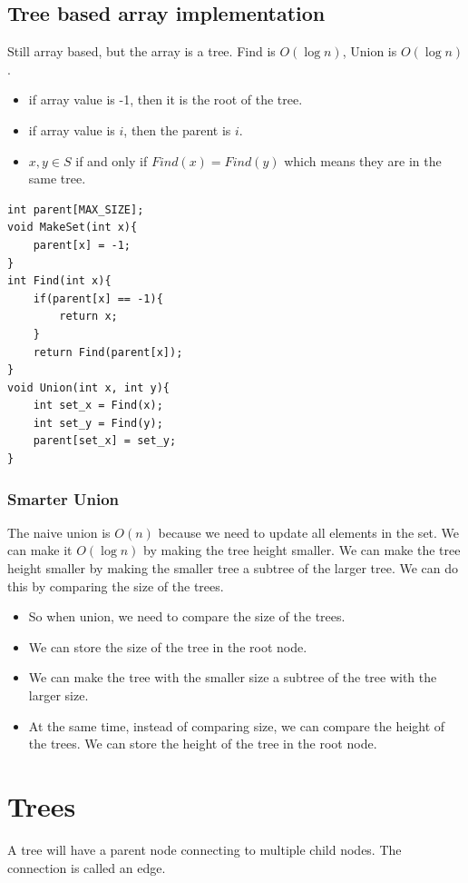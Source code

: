\documentclass[letterpaper,12pt]{article}
\begin{document}
\subsection{Tree based array implementation}
Still array based, but the array is a tree. Find is $O(\log n)$, Union is $O(\log n)$.\begin{itemize}
    \item if array value is -1, then it is the root of the tree.
    \item if array value is $i$, then the parent is $i$.
    \item $x,y \in S$ if and only if $Find(x) = Find(y)$ which means they are in the same tree.
\end{itemize}
\begin{lstlisting}
int parent[MAX_SIZE];
void MakeSet(int x){
    parent[x] = -1;
}
int Find(int x){
    if(parent[x] == -1){
        return x;
    }
    return Find(parent[x]);
}
void Union(int x, int y){
    int set_x = Find(x);
    int set_y = Find(y);
    parent[set_x] = set_y;
}
\end{lstlisting}
\subsubsection{Smarter Union}
The naive union is $O(n)$ because we need to update all elements in the set. We can make it $O(\log n)$ by making the tree height smaller. We can make the tree height smaller by making the smaller tree a subtree of the larger tree. We can do this by comparing the size of the trees.
\begin{itemize}
    \item So when union, we need to compare the size of the trees.
    \item We can store the size of the tree in the root node.
    \item We can make the tree with the smaller size a subtree of the tree with the larger size.
\end{itemize}
\begin{itemize}
    \item At the same time, instead of comparing size, we can compare the height of the trees. We can store the height of the tree in the root node.
\end{itemize}
\section{Trees}
A tree will have a parent node connecting to multiple child nodes. The connection is called an edge. 
\end{document}
